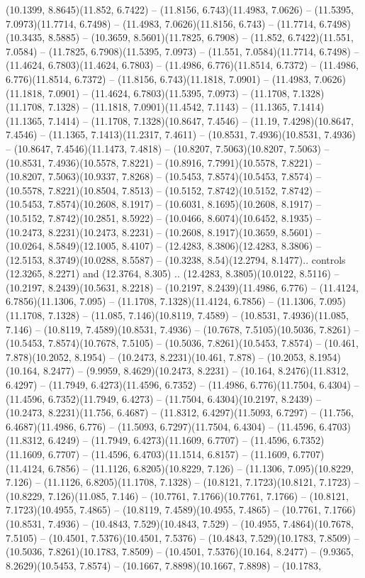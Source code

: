 (10.1399, 8.8645)(11.852, 6.7422) -- (11.8156, 6.743)(11.4983, 7.0626) -- (11.5395, 7.0973)(11.7714, 6.7498) -- (11.4983, 7.0626)(11.8156, 6.743) -- (11.7714, 6.7498)(10.3435, 8.5885) -- (10.3659, 8.5601)(11.7825, 6.7908) -- (11.852, 6.7422)(11.551, 7.0584) -- (11.7825, 6.7908)(11.5395, 7.0973) -- (11.551, 7.0584)(11.7714, 6.7498) -- (11.4624, 6.7803)(11.4624, 6.7803) -- (11.4986, 6.776)(11.8514, 6.7372) -- (11.4986, 6.776)(11.8514, 6.7372) -- (11.8156, 6.743)(11.1818, 7.0901) -- (11.4983, 7.0626)(11.1818, 7.0901) -- (11.4624, 6.7803)(11.5395, 7.0973) -- (11.1708, 7.1328)(11.1708, 7.1328) -- (11.1818, 7.0901)(11.4542, 7.1143) -- (11.1365, 7.1414)(11.1365, 7.1414) -- (11.1708, 7.1328)(10.8647, 7.4546) -- (11.19, 7.4298)(10.8647, 7.4546) -- (11.1365, 7.1413)(11.2317, 7.4611) -- (10.8531, 7.4936)(10.8531, 7.4936) -- (10.8647, 7.4546)(11.1473, 7.4818) -- (10.8207, 7.5063)(10.8207, 7.5063) -- (10.8531, 7.4936)(10.5578, 7.8221) -- (10.8916, 7.7991)(10.5578, 7.8221) -- (10.8207, 7.5063)(10.9337, 7.8268) -- (10.5453, 7.8574)(10.5453, 7.8574) -- (10.5578, 7.8221)(10.8504, 7.8513) -- (10.5152, 7.8742)(10.5152, 7.8742) -- (10.5453, 7.8574)(10.2608, 8.1917) -- (10.6031, 8.1695)(10.2608, 8.1917) -- (10.5152, 7.8742)(10.2851, 8.5922) -- (10.0466, 8.6074)(10.6452, 8.1935) -- (10.2473, 8.2231)(10.2473, 8.2231) -- (10.2608, 8.1917)(10.3659, 8.5601) -- (10.0264, 8.5849)(12.1005, 8.4107) -- (12.4283, 8.3806)(12.4283, 8.3806) -- (12.5153, 8.3749)(10.0288, 8.5587) -- (10.3238, 8.54)(12.2794, 8.1477).. controls (12.3265, 8.2271) and (12.3764, 8.305) .. (12.4283, 8.3805)(10.0122, 8.5116) -- (10.2197, 8.2439)(10.5631, 8.2218) -- (10.2197, 8.2439)(11.4986, 6.776) -- (11.4124, 6.7856)(11.1306, 7.095) -- (11.1708, 7.1328)(11.4124, 6.7856) -- (11.1306, 7.095)(11.1708, 7.1328) -- (11.085, 7.146)(10.8119, 7.4589) -- (10.8531, 7.4936)(11.085, 7.146) -- (10.8119, 7.4589)(10.8531, 7.4936) -- (10.7678, 7.5105)(10.5036, 7.8261) -- (10.5453, 7.8574)(10.7678, 7.5105) -- (10.5036, 7.8261)(10.5453, 7.8574) -- (10.461, 7.878)(10.2052, 8.1954) -- (10.2473, 8.2231)(10.461, 7.878) -- (10.2053, 8.1954)(10.164, 8.2477) -- (9.9959, 8.4629)(10.2473, 8.2231) -- (10.164, 8.2476)(11.8312, 6.4297) -- (11.7949, 6.4273)(11.4596, 6.7352) -- (11.4986, 6.776)(11.7504, 6.4304) -- (11.4596, 6.7352)(11.7949, 6.4273) -- (11.7504, 6.4304)(10.2197, 8.2439) -- (10.2473, 8.2231)(11.756, 6.4687) -- (11.8312, 6.4297)(11.5093, 6.7297) -- (11.756, 6.4687)(11.4986, 6.776) -- (11.5093, 6.7297)(11.7504, 6.4304) -- (11.4596, 6.4703)(11.8312, 6.4249) -- (11.7949, 6.4273)(11.1609, 6.7707) -- (11.4596, 6.7352)(11.1609, 6.7707) -- (11.4596, 6.4703)(11.1514, 6.8157) -- (11.1609, 6.7707)(11.4124, 6.7856) -- (11.1126, 6.8205)(10.8229, 7.126) -- (11.1306, 7.095)(10.8229, 7.126) -- (11.1126, 6.8205)(11.1708, 7.1328) -- (10.8121, 7.1723)(10.8121, 7.1723) -- (10.8229, 7.126)(11.085, 7.146) -- (10.7761, 7.1766)(10.7761, 7.1766) -- (10.8121, 7.1723)(10.4955, 7.4865) -- (10.8119, 7.4589)(10.4955, 7.4865) -- (10.7761, 7.1766)(10.8531, 7.4936) -- (10.4843, 7.529)(10.4843, 7.529) -- (10.4955, 7.4864)(10.7678, 7.5105) -- (10.4501, 7.5376)(10.4501, 7.5376) -- (10.4843, 7.529)(10.1783, 7.8509) -- (10.5036, 7.8261)(10.1783, 7.8509) -- (10.4501, 7.5376)(10.164, 8.2477) -- (9.9365, 8.2629)(10.5453, 7.8574) -- (10.1667, 7.8898)(10.1667, 7.8898) -- (10.1783, 